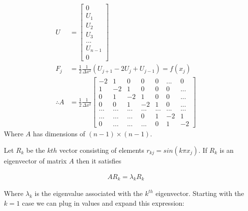 \documentclass{article}
\newcommand{\n}{\newline}
\begin{document}
	\begin{align*}
		U&=\begin{bmatrix}
			0\\
			U_{1}\\
			U_{2}\\
			U_{3}\\
			...\\
			U_{n-1}\\
			0
			\end{bmatrix}\\
		F_j&=\frac{1}{2}\frac{1}{\Delta x^{2}}(U_{j+1}-2U_{j}+U_{j-1})=f(x_j)\\
		\therefore A&=\frac{1}{2}\frac{1}{\Delta x^{2}}\begin{bmatrix}
		-2 & 1 & 0 & 0 & 0 & ... & 0\\
		1 & -2 & 1 & 0 & 0 & 0 & ...\\
		0 & 1 & -2 & 1 & 0 & 0 & ... \\
		0 & 0 & 1 & -2 & 1 & 0 & ... \\
		... & ... & ... & ... & ... & ... & ... \\
		... & ... & ... & 0 & 1 & -2 & 1 \\
		0 & ... & ... & ... & 0 & 1 & -2 
		\end{bmatrix}
	\end{align*}
	Where $A$ has dimensions of $(n-1)\times (n-1)$.  \n
	
	Let $R_{k}$ be the $kth$ vector consisting of elements $r_{kj}=sin(k\pi x_{j})$.  If $R_{k}$ is an eigenvector of matrix $A$ then it satisfies
	
	\begin{align*}
		AR_{k}=\lambda_{k}R_{k}
	\end{align*}  
	
	Where $\lambda_{k}$ is the eigenvalue associated with the $k^{th}$ eigenvector.  Starting with the $k=1$ case we can plug in values and expand this expression:
	
\end{document}
